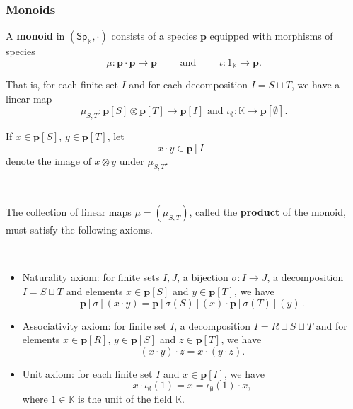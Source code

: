 \documentclass[12pt, reqno]{amsart}
\theoremstyle{definition}
\newcommand{\Ssk}{\mathsf{Sp}_\Kb} %
\newcommand{\Kb}{\mathbb{K}}
\newcommand{\tp}{\mathbf{p}}
\begin{document}
\subsubsection{Monoids}
A {\bf monoid} in $(\Ssk, \cdot)$ consists of a species $\tp$ equipped with morphisms of species
\begin{equation*}
    \mu: \tp \cdot \tp \to \tp \qquad \text{ and } \qquad \iota: \mathrm{1}_{\mathbb{K}} \to \tp.
\end{equation*}

That is, for each finite set $I$ and for each decomposition $I=S \sqcup T$, we have a linear map 
\begin{equation*}
    \mu_{S,T}: \tp[S] \otimes \tp[T]\to \tp[I] \text{ and } \iota_\emptyset: \mathbb{K} \to \tp[\emptyset].
\end{equation*}

If $x \in \tp[S]$, $y \in \tp[T]$,  let 
\[x \cdot y \in \tp[I]\]
denote the image of $x\otimes y$ under $\mu_{S,T}$. 

\

The collection of linear maps $\mu=(\mu_{S,T})$, called the {\bf product} of the monoid, must satisfy the following axioms.

\

\begin{itemize}
    \item[(i)] Naturality axiom: for finite sets $I,J$, a bijection $\sigma: I \to J$, a decomposition $I=S \sqcup T$ and elements $x \in \tp[S]$ and $y \in \tp[T]$, we have
\begin{equation*}
\tp[\sigma](x \cdot y)=\tp[\sigma(S)](x) \cdot \tp[\sigma(T)](y) \, .
\end{equation*}

\item[(ii)] Associativity axiom: for finite set $I$, a decomposition $I=R \sqcup S \sqcup T$ and for elements $x \in \tp[R]$, $y \in \tp[S]$ and $z \in \tp[T]$, we have
\begin{equation}\label{eq:axiomii}
    (x \cdot y)\cdot z=x \cdot (y \cdot z).
\end{equation}

\item[(iii)] Unit axiom: for each finite set $I$ and $x \in \tp[I]$, we have
\begin{equation*}
 x \cdot \iota_\emptyset(1) = x =  \iota_\emptyset(1) \cdot x,
\end{equation*}
where $1\in \mathbb{K}$ is the unit of the field $\mathbb{K}$.

\end{itemize}
\end{document}
